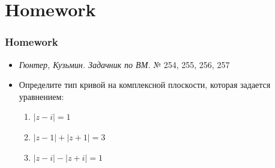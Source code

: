 \documentclass[10pt]{beamer}
\begin{document}
    \section{Homework}
    \begin{frame}
        \frametitle{Homework}
        \begin{itemize}
            \item \textit{Гюнтер, Кузьмин. Задачник по ВМ.} № 254, 255, 256, 257
            \item Определите тип кривой на комплексной плоскости, которая задается уравнением:
            \begin{enumerate}
                \item $|z-i|=1$
                \item $|z-1|+|z+1|=3$
                \item $|z-i|-|z+i|=1$
            \end{enumerate}
        \end{itemize}
    \end{frame}
\end{document}

